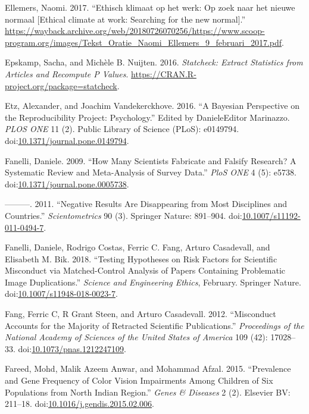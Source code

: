 \documentclass[a5paper]{book}
\begin{document}
\hypertarget{ref-ellemers}{}
Ellemers, Naomi. 2017. ``Ethisch klimaat op het werk: Op zoek naar het
nieuwe normaal {[}Ethical climate at work: Searching for the new
normal{]}.''
\url{https://wayback.archive.org/web/20180726070256/https://www.scoop-program.org/images/Tekst_Oratie_Naomi_Ellemers_9_februari_2017.pdf}.

\hypertarget{ref-statcheck}{}
Epskamp, Sacha, and Michèle B. Nuijten. 2016. \emph{Statcheck: Extract
Statistics from Articles and Recompute P Values}.
\url{https://CRAN.R-project.org/package=statcheck}.

\hypertarget{ref-doi:10.1371ux2fjournal.pone.0149794}{}
Etz, Alexander, and Joachim Vandekerckhove. 2016. ``A Bayesian
Perspective on the Reproducibility Project: Psychology.'' Edited by
DanieleEditor Marinazzo. \emph{PLOS ONE} 11 (2). Public Library of
Science (PLoS): e0149794.
doi:\href{https://doi.org/10.1371/journal.pone.0149794}{10.1371/journal.pone.0149794}.

\hypertarget{ref-doi:10.1371ux2fjournal.pone.0005738}{}
Fanelli, Daniele. 2009. ``How Many Scientists Fabricate and Falsify
Research? A Systematic Review and Meta-Analysis of Survey Data.''
\emph{PloS ONE} 4 (5): e5738.
doi:\href{https://doi.org/10.1371/journal.pone.0005738}{10.1371/journal.pone.0005738}.

\hypertarget{ref-doi:10.1007ux2fs11192-011-0494-7}{}
---------. 2011. ``Negative Results Are Disappearing from Most
Disciplines and Countries.'' \emph{Scientometrics} 90 (3). Springer
Nature: 891--904.
doi:\href{https://doi.org/10.1007/s11192-011-0494-7}{10.1007/s11192-011-0494-7}.

\hypertarget{ref-doi:10.1007ux2fs11948-018-0023-7}{}
Fanelli, Daniele, Rodrigo Costas, Ferric C. Fang, Arturo Casadevall, and
Elisabeth M. Bik. 2018. ``Testing Hypotheses on Risk Factors for
Scientific Misconduct via Matched-Control Analysis of Papers Containing
Problematic Image Duplications.'' \emph{Science and Engineering Ethics},
February. Springer Nature.
doi:\href{https://doi.org/10.1007/s11948-018-0023-7}{10.1007/s11948-018-0023-7}.

\hypertarget{ref-doi:10.1073ux2fpnas.1212247109}{}
Fang, Ferric C, R Grant Steen, and Arturo Casadevall. 2012. ``Misconduct
Accounts for the Majority of Retracted Scientific Publications.''
\emph{Proceedings of the National Academy of Sciences of the United
States of America} 109 (42): 17028--33.
doi:\href{https://doi.org/10.1073/pnas.1212247109}{10.1073/pnas.1212247109}.

\hypertarget{ref-doi:10.1016ux2fj.gendis.2015.02.006}{}
Fareed, Mohd, Malik Azeem Anwar, and Mohammad Afzal. 2015. ``Prevalence
and Gene Frequency of Color Vision Impairments Among Children of Six
Populations from North Indian Region.'' \emph{Genes \& Diseases} 2 (2).
Elsevier BV: 211--18.
doi:\href{https://doi.org/10.1016/j.gendis.2015.02.006}{10.1016/j.gendis.2015.02.006}.
\end{document}
